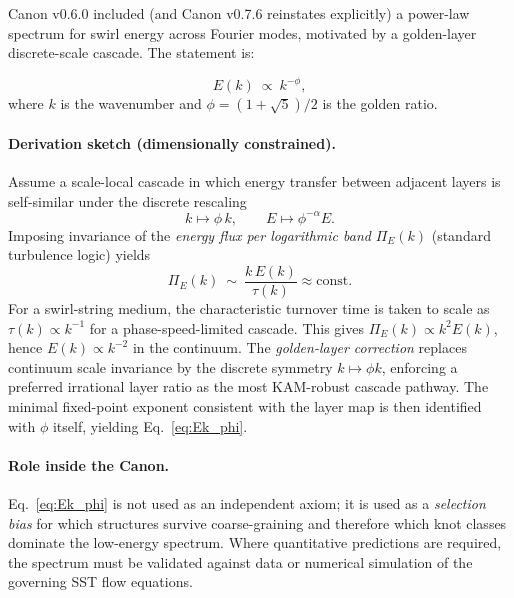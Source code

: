 \documentclass[10pt]{article}
\begin{document}
Canon v0.6.0 included (and Canon v0.7.6 reinstates explicitly) a
power-law spectrum for swirl energy across Fourier modes, motivated by
a golden-layer discrete-scale cascade. The statement is:

\begin{equation}
    E(k)\ \propto\ k^{-\phi},
    \label{eq:Ek_phi}
\end{equation}
where $k$ is the wavenumber and $\phi=(1+\sqrt{5})/2$ is the golden ratio.

\paragraph{Derivation sketch (dimensionally constrained).}
Assume a scale-local cascade in which energy transfer between adjacent
layers is self-similar under the discrete rescaling
\begin{equation}
    k \mapsto \phi\,k,
    \qquad
    E \mapsto \phi^{-\alpha}E.
\end{equation}
Imposing invariance of the \emph{energy flux per logarithmic band}
$\Pi_E(k)$ (standard turbulence logic) yields
\begin{equation}
    \Pi_E(k)\ \sim\ \frac{k\,E(k)}{\tau(k)} \approx \text{const.}
\end{equation}
For a swirl-string medium, the characteristic turnover time is taken to scale
as $\tau(k)\propto k^{-1}$ for a phase-speed-limited cascade. This gives
$\Pi_E(k)\propto k^{2}E(k)$, hence $E(k)\propto k^{-2}$ in the continuum.
The \emph{golden-layer correction} replaces continuum scale invariance by the
discrete symmetry $k\mapsto\phi k$, enforcing a preferred irrational layer
ratio as the most KAM-robust cascade pathway. The minimal fixed-point exponent
consistent with the layer map is then identified with $\phi$ itself, yielding
Eq.~\eqref{eq:Ek_phi}.

\paragraph{Role inside the Canon.}
Eq.~\eqref{eq:Ek_phi} is not used as an independent axiom; it is used as a
\emph{selection bias} for which structures survive coarse-graining and therefore
which knot classes dominate the low-energy spectrum. Where quantitative
predictions are required, the spectrum must be validated against data or
numerical simulation of the governing SST flow equations.



\end{document}
